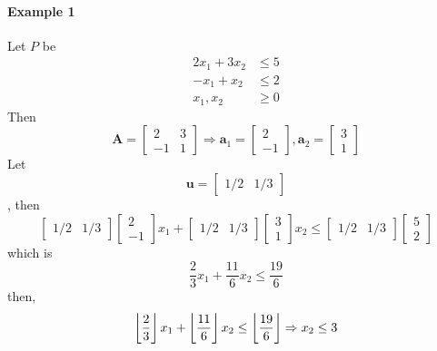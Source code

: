             \paragraph{Example 1}
                Let $P$ be
                \begin{align*}
                    2 x_1 + 3 x_2 &\le 5\\
                    -x_1 + x_2 &\le 2\\
                    x_1, x_2 &\ge 0
                \end{align*}
                Then
                \begin{equation*}
                    \mathbf{A} = \begin{bmatrix}2 & 3 \\ -1 & 1\end{bmatrix} \Rightarrow \mathbf{a}_1 = \begin{bmatrix}2 \\ -1\end{bmatrix}, \mathbf{a}_2 = \begin{bmatrix}3 \\ 1\end{bmatrix}
                \end{equation*}
                Let
                \begin{equation*}
                    \mathbf{u} = \begin{bmatrix}1/2 & 1/3\end{bmatrix}
                \end{equation*},
                then
                \begin{equation*}
                    \begin{bmatrix}1/2 & 1/3\end{bmatrix} \begin{bmatrix}2 \\ -1\end{bmatrix} x_1 + \begin{bmatrix}1/2 & 1/3\end{bmatrix} \begin{bmatrix}3 \\ 1\end{bmatrix} x_2 \le \begin{bmatrix}1/2 & 1/3\end{bmatrix} \begin{bmatrix}5 \\ 2\end{bmatrix}
                \end{equation*}
                which is
                \begin{equation*}
                    \frac{2}{3} x_1 + \frac{11}{6} x_2 \le \frac{19}{6}
                \end{equation*}
                then, 
                \begin{equation*}
                    \left\lfloor \frac{2}{3} \right\rfloor x_1 + \left\lfloor \frac{11}{6} \right\rfloor x_2 \le \left\lfloor \frac{19}{6} \right\rfloor \Rightarrow x_2 \le 3
                \end{equation*}

